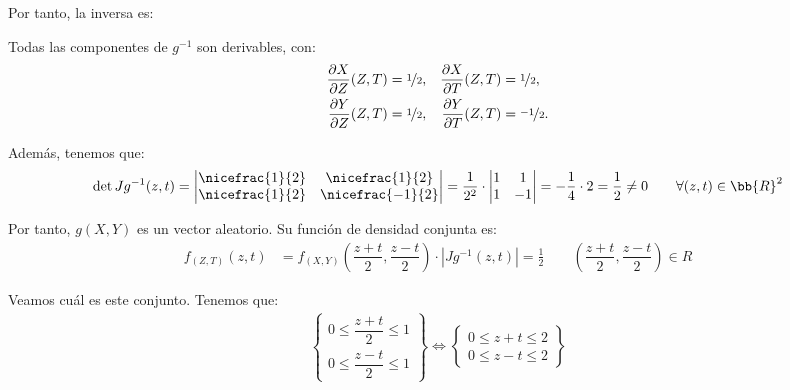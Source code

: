 \documentclass[12pt]{article}
\begin{document}
\begin{ejercicio}
\begin{enumerate}
            Por tanto, la inversa es:

            Todas las componentes de $g^{-1}$ son derivables, con:
            \begin{align*}
                \dfrac{\partial X}{\partial Z}(Z,T)&=\nicefrac{1}{2}, & \dfrac{\partial X}{\partial T}(Z,T)&=\nicefrac{1}{2},\\
                \dfrac{\partial Y}{\partial Z}(Z,T)&=\nicefrac{1}{2}, & \dfrac{\partial Y}{\partial T}(Z,T)&=\nicefrac{-1}{2}.
            \end{align*}

            Además, tenemos que:
            \begin{equation*}
                \det Jg^{-1}(z,t) = \begin{vmatrix}
                    \nicefrac{1}{2} & \nicefrac{1}{2}\\
                    \nicefrac{1}{2} & \nicefrac{-1}{2}
                \end{vmatrix}
                = \dfrac{1}{2^2}\cdot \begin{vmatrix}
                    1 & 1\\
                    1 & -1
                \end{vmatrix} = -\dfrac{1}{4}\cdot 2 = \frac{1}{2}\neq 0\qquad \forall (z,t)\in \bb{R}^2
            \end{equation*}

            Por tanto, $g(X,Y)$ es un vector aleatorio. Su función de densidad conjunta es:
            \begin{align*}
                f_{(Z,T)}(z,t) &= f_{(X,Y)}\left(\dfrac{z+t}{2},\dfrac{z-t}{2}\right) \cdot |Jg^{-1}(z,t)| = \frac{1}{2}\qquad \left(\dfrac{z+t}{2},\dfrac{z-t}{2}\right)\in R
            \end{align*}

            Veamos cuál es este conjunto. Tenemos que:
            \begin{align*}
                \left\{
                    \begin{array}{l}
                        0\leq \dfrac{z+t}{2}\leq 1\\
                        0\leq \dfrac{z-t}{2}\leq 1
                    \end{array}
                \right\}
                \Longleftrightarrow
                \left\{
                    \begin{array}{l}
                        0\leq z+t\leq 2\\
                        0\leq z-t\leq 2
                    \end{array}
                \right\}
            \end{align*}


\end{enumerate}
\end{ejercicio}
\end{document}
